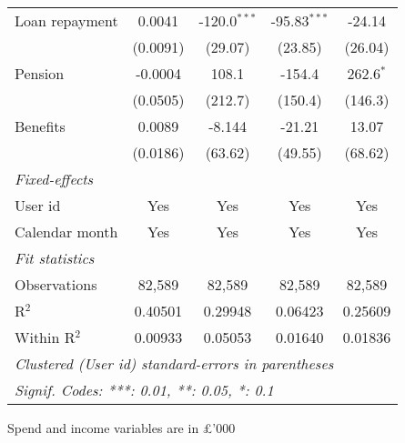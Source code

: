 \begin{table}[htbp]
\begin{threeparttable}[b]
\begin{tabular}{lcccc}
         Loan repayment       & 0.0041             & -120.0$^{***}$ & -95.83$^{***}$ & -24.14\\   
                              & (0.0091)           & (29.07)        & (23.85)        & (26.04)\\   
         Pension              & -0.0004            & 108.1          & -154.4         & 262.6$^{*}$\\   
                              & (0.0505)           & (212.7)        & (150.4)        & (146.3)\\   
         Benefits             & 0.0089             & -8.144         & -21.21         & 13.07\\   
                              & (0.0186)           & (63.62)        & (49.55)        & (68.62)\\   
         \midrule
         \emph{Fixed-effects}\\
         User id              & Yes                & Yes            & Yes            & Yes\\  
         Calendar month       & Yes                & Yes            & Yes            & Yes\\  
         \midrule
         \emph{Fit statistics}\\
         Observations         & 82,589             & 82,589         & 82,589         & 82,589\\  
         R$^2$                & 0.40501            & 0.29948        & 0.06423        & 0.25609\\  
         Within R$^2$         & 0.00933            & 0.05053        & 0.01640        & 0.01836\\  
         \midrule \midrule
         \multicolumn{5}{l}{\emph{Clustered (User id) standard-errors in parentheses}}\\
         \multicolumn{5}{l}{\emph{Signif. Codes: ***: 0.01, **: 0.05, *: 0.1}}\\
      \end{tabular}
      
      \begin{tablenotes}\footnotesize
         \item Spend and income variables are in \pounds'000
      \end{tablenotes}
   \end{threeparttable}
\end{table}


